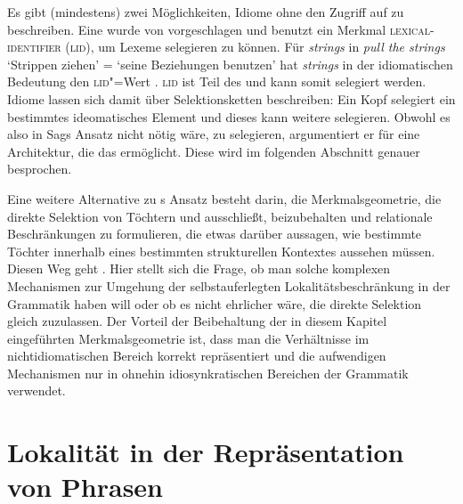 Es gibt (mindestens) zwei Möglichkeiten, Idiome ohne den Zugriff auf \phon zu beschreiben. Eine
wurde von \citet[Abschnitt~5.4]{Sag2007a} vorgeschlagen und benutzt ein Merkmal \textsc{lexical-identifier} (\textsc{lid}), um Lexeme selegieren
zu können. Für \emph{strings} in \emph{pull the strings} `Strippen ziehen' = `seine Beziehungen benutzen' hat
\emph{strings} in der idiomatischen Bedeutung den \textsc{lid}"=Wert
\mbox{}. \textsc{lid} ist Teil des \catwes und kann somit selegiert werden. Idiome
lassen sich damit über Selektionsketten beschreiben: Ein Kopf selegiert ein bestimmtes ideomatisches
Element und dieses kann weitere selegieren. Obwohl es also in Sags Ansatz nicht nötig wäre, \phon zu
selegieren, argumentiert er für eine Architektur, die das ermöglicht. Diese wird im folgenden
Abschnitt genauer besprochen.

Eine weitere Alternative zu \citeauthor{KE94a}s Ansatz besteht darin, die Merkmalsgeometrie, die direkte Selektion von Töchtern und \phon
ausschließt, beizubehalten und relationale Beschränkungen zu formulieren, die etwas darüber
aussagen, wie bestimmte Töchter innerhalb eines bestimmten strukturellen Kontextes aussehen
müssen. Diesen Weg geht \zb \citet{Sailer2000a}. Hier stellt sich die Frage, ob man solche
komplexen Mechanismen zur Umgehung der selbstauferlegten Lokalitätsbeschränkung
in der Grammatik haben will oder ob es nicht ehrlicher wäre, die direkte Selektion gleich zuzulassen.
Der Vorteil der Beibehaltung der in diesem Kapitel eingeführten Merkmalsgeometrie ist, dass
man die Verhältnisse im nichtidiomatischen Bereich korrekt repräsentiert und die aufwendigen
Mechanismen nur in ohnehin idiosynkratischen Bereichen der Grammatik verwendet.%


\section{Lokalität in der Repräsentation von Phrasen}

